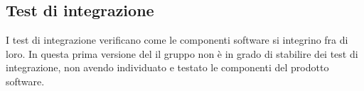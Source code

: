 \subsection{Test di integrazione}
I test di integrazione verificano come le componenti software si integrino fra di loro.
In questa prima versione del \PdQv{} il gruppo non è in grado di stabilire dei test di integrazione, non avendo individuato e testato le componenti del prodotto software.
